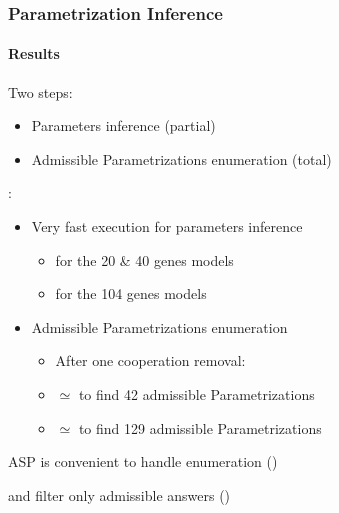 \begin{frame}[c]
  \frametitle{Parametrization Inference}
  \framesubtitle{Results}

Two steps:
\begin{itemize}
  \item Parameters inference (partial)
  \item Admissible Parametrizations enumeration (total)
\end{itemize}


\medskip

\pause

:
\begin{itemize}
  \item Very fast execution for parameters inference
  \begin{itemize}
    \item[]  for the 20 \& 40 genes models \quad{}
    \item[]  for the 104 genes models \quad\tval{\ex{[EGFR104]}}
  \end{itemize}
  \item Admissible Parametrizations enumeration
  \begin{itemize}
    \item[] After one cooperation removal:
    \item[] \quad $\simeq$  to find 42 admissible Parametrizations \quad\tval{\ex{[TCRSIG40]}}
    \item[] \quad $\simeq$  to find 129 admissible Parametrizations \quad\tval{\ex{[EGFR20]}}
  \end{itemize}
\end{itemize}

\medskip
ASP is convenient to handle enumeration ()

and filter only admissible answers ()

\end{frame}
